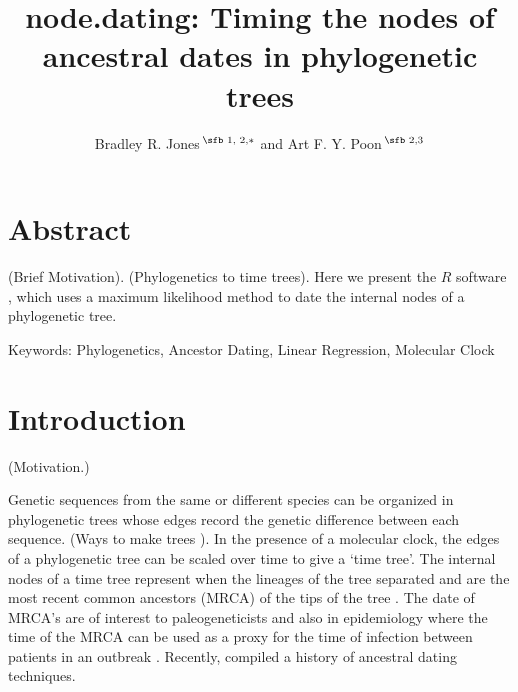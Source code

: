 \documentclass{bioinfo}
\begin{document}

\subtitle{}

\title[node.dating]{node.dating: Timing the nodes of ancestral dates in phylogenetic trees}
\author[Jones \textit{et~al}.]{Bradley R. Jones\,$^{\text{\sfb 1, 2,}*}$ and Art F. Y. Poon\,$^{\text{\sfb 2,3}}$}
\address{$^{\text{\sf 1}}$Faculty of Health Sciences, Simon Fraser University, Burnaby, V5A 1S6, Canada, \\
$^{\text{\sf 2}}$BC Centre for Excellence in HIV/AIDS, Vancouver, V6Z 1Y6, Canada and \\
$^{\text{\sf 2}}$Department of Medicine, University of British Columbia, V5Z 1M9, Canada}





\maketitle

\section * {Abstract}
(Brief Motivation).
(Phylogenetics to time trees).
Here we present the $R$ software , which uses a maximum likelihood method to date the internal nodes of a phylogenetic tree.

Keywords: 
Phylogenetics, Ancestor Dating, Linear Regression, Molecular Clock \\

\underline{}
\section{Introduction} \label{sec:intro}
(Motivation.)

Genetic sequences from the same or different species can be organized in phylogenetic trees whose edges record the genetic difference between each sequence.
(Ways to make trees \citep{Raxml14}).
In the presence of a molecular clock, the edges of a phylogenetic tree can be scaled over time to give a `time tree'.
The internal nodes of a time tree represent when the lineages of the tree separated and are the most recent common ancestors (MRCA) of the tips of the tree \citep{}.
The date of MRCA's are of interest to paleogeneticists \citep{} and also in epidemiology where the time of the MRCA can be used as a proxy for the time of infection between patients in an outbreak \citep{}. Recently, \cite{Kumar16} compiled a history of ancestral dating techniques.
\end{document}
